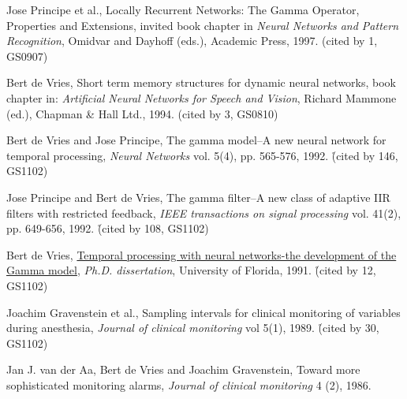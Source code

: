 \begin{etaremune}
\item Jose Principe et al., Locally Recurrent Networks: The Gamma
Operator, Properties and Extensions, invited book chapter in {\em
Neural Networks and Pattern Recognition}, Omidvar and Dayhoff
(eds.), Academic Press, 1997. (cited by 1, GS0907)

\item Bert de Vries, Short term memory structures for dynamic neural networks, book chapter in:
{\em Artificial Neural Networks for Speech and Vision}, Richard Mammone (ed.), Chapman \& Hall Ltd.,
1994. (cited by 3, GS0810)

\item Bert de Vries and Jose Principe, The gamma model--A new neural
network for temporal processing, {\em Neural Networks} vol. 5(4),
pp. 565-576, 1992. \r{(cited by 146, GS1102)}

\item Jose Principe and Bert de Vries, The gamma filter--A new class of adaptive IIR filters
with restricted feedback,  {\em IEEE transactions on signal
processing}  vol. 41(2), pp. 649-656, 1992. \r{(cited by 108, GS1102)}

\item Bert de Vries, \href{http://ufdc.ufl.edu/UF00082173/00001}{Temporal processing with neural networks-the development of the Gamma model},
{\em Ph.D. dissertation}, University of Florida, 1991. \r{(cited by 12, GS1102)}

\item Joachim Gravenstein et
al., Sampling intervals for clinical monitoring of variables during
anesthesia,  {\em Journal of clinical monitoring} vol 5(1), 1989. \r{(cited by 30, GS1102)}

\item Jan J. van der Aa, Bert de Vries and Joachim
Gravenstein, Toward more sophisticated monitoring alarms,  {\em
Journal of clinical monitoring} 4 (2), 1986.

\end{etaremune}
 

{}

